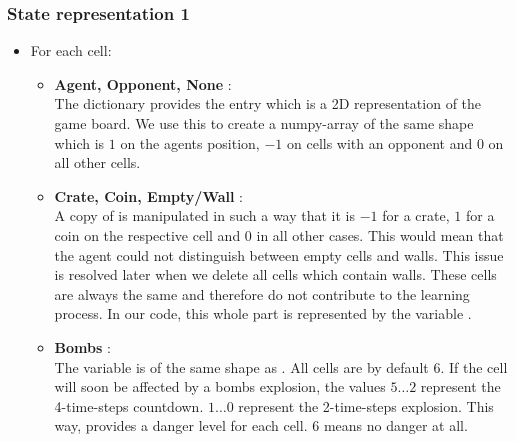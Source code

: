 	\subsubsection{State representation 1}
	\label{State_rep_1}
	\begin{itemize}
		\item For each cell:
		\begin{itemize}
			\item \textbf{Agent, Opponent, None }:\\
			The dictionary provides the entry  which is a 2D representation of the game board. We use this to create a numpy-array  of the same shape which is $1$ on the agents position, $-1$ on cells with an opponent and $0$ on all other cells.
			\item \textbf{Crate, Coin, Empty/Wall }: \\
			A copy of  is manipulated in such a way that it is $-1$ for a crate, $1$ for a coin on the respective cell and $0$ in all other cases. This would mean that the agent could not distinguish between empty cells and walls. This issue is resolved later when we delete all cells which contain walls. These cells are always the same and therefore do not contribute to the learning process. In our code, this whole part is represented by the variable .
			\item \textbf{Bombs} :\\
			The variable  is of the same shape as . All cells are by default $6$. If the cell will soon be affected by a bombs explosion, the values $5\dots2$ represent the 4-time-steps countdown. $1\dots0$ represent the 2-time-steps explosion. This way,  provides a danger level for each cell. $6$ means no danger at all.
			

\end{itemize}
\end{itemize}
